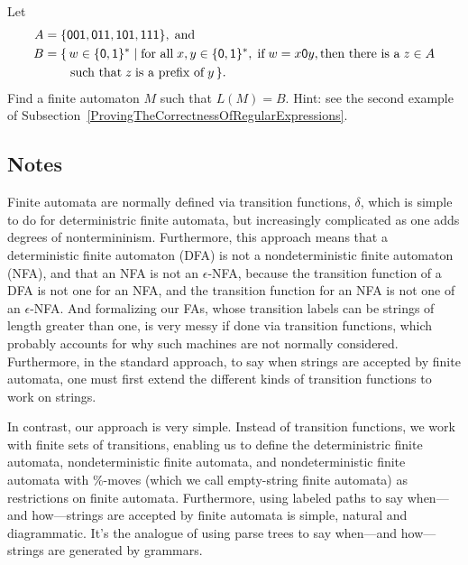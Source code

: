 \begin{exercise}
Let
\begin{align*}
A &=\{\mathsf{001, 011, 101, 111}\} , \;\allowbreak\mbox{and}\allowbreak\; \\
B &=\{\,w\in\{\mathsf{0,1}\}^* \mid \allowbreak\mbox{for all}\allowbreak\;x,y\in\{\mathsf{0,1}\}^*,
\;\allowbreak\mbox{if}\allowbreak\;w=x\mathsf{0} y, \allowbreak\mbox{then there is a}\allowbreak\; z\in A \\
&\quad\;\;\; \;\allowbreak\mbox{such that}\allowbreak\; z\;\allowbreak\mbox{is a prefix of}\allowbreak\; y\,\}.
\end{align*}
Find a finite automaton $M$ such that $L(M)=B$.  Hint: see the second
example of Subsection~\ref{ProvingTheCorrectnessOfRegularExpressions}.
\end{exercise}

%

\subsection{Notes}

Finite automata are normally defined via transition functions,
$\delta$, which is simple to do for deterministric finite automata,
but increasingly complicated as one adds degrees of nontermininism.
Furthermore, this approach means that a deterministic finite automaton
(DFA) is not a nondeterministic finite automaton (NFA), and that an
NFA is not an $\epsilon$-NFA, because the transition function of a DFA
is not one for an NFA, and the transition function for an NFA is not
one of an $\epsilon$-NFA.  And formalizing our FAs, whose transition
labels can be strings of length greater than one, is very messy if
done via transition functions, which probably accounts for why such
machines are not normally considered.  Furthermore, in the standard
approach, to say when strings are accepted by finite automata, one must
first extend the different kinds of transition functions to work on
strings.

In contrast, our approach is very simple.  Instead of transition
functions, we work with finite sets of transitions, enabling us to
define the deterministric finite automata, nondeterministic finite
automata, and nondeterministic finite automata with $\%$-moves (which
we call empty-string finite automata) as restrictions on finite
automata.  Furthermore, using labeled paths to say when---and
how---strings are accepted by finite automata is simple, natural and
diagrammatic.  It's the analogue of using parse trees to say
when---and how---strings are generated by grammars.


